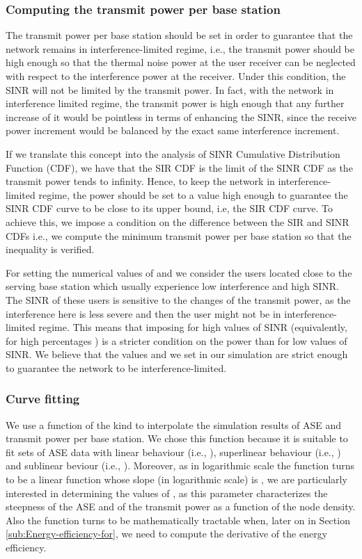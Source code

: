 \documentclass[twocoumn]{IEEEtran}
\begin{document}
\subsubsection{Computing the transmit power per base station}\label{sub:Computing-the-transmit}

The transmit power per base station should be set in order to guarantee that the network remains in interference-limited regime, i.e.,  the transmit power should be high enough so that the thermal noise power at the user receiver can be neglected with respect to the interference power at the receiver. Under this condition, the SINR will not be limited by the transmit power. In fact, with the network in interference limited regime, the transmit power is high enough that any further increase of it would be pointless in terms of enhancing the SINR, since the receive power increment would be balanced by the exact same interference increment. 

If we translate this concept into the analysis of SINR Cumulative Distribution Function (CDF), we have that the SIR CDF  is the limit of the SINR CDF  as the transmit power tends to infinity. Hence, to keep the network in interference-limited regime, the power should be set to a value high enough to guarantee the SINR CDF curve to be close to its upper bound, i.e,  the SIR CDF curve. To achieve this, we impose a condition on the difference between the SIR
and SINR CDFs i.e., we compute the minimum transmit power per base station so that the inequality  is verified.

For setting the numerical values of  and  we consider the users located close to the serving base station which usually experience low interference and high SINR. The SINR of these users is sensitive to the changes of the transmit power, as the interference here is less severe and then the user might not be in interference-limited regime. This means that imposing  for high values of SINR (equivalently, for high percentages ) is a stricter condition on the power than for low values of SINR. We believe that the values  and  we set in our simulation are strict enough to guarantee the network to be interference-limited.



\subsubsection{Curve fitting}

We use a function of the kind  to interpolate the simulation results of ASE and transmit power per base station. We chose this function because it is suitable to fit sets of ASE data with linear behaviour (i.e., ), superlinear behaviour (i.e., ) and sublinear beviour (i.e., ). Moreover, as in logarithmic scale the function  turns to be a linear function whose slope (in logarithmic scale) is , we are particularly interested in determining the values of , as this parameter characterizes the steepness
of the ASE and of the transmit power as a function of the node density. Also the function  turns to be mathematically tractable when,
later on in Section \eqref{sub:Energy-efficiency-for}, we need to
compute the derivative of the energy efficiency.
\end{document}
